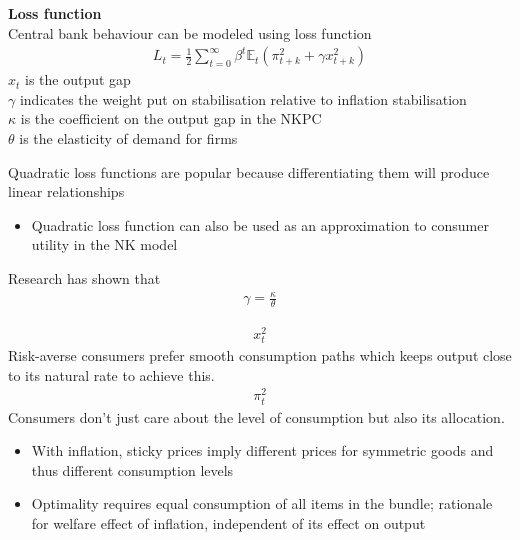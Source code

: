 \documentclass{beamer}
\begin{document}
\begin{frame}
  \textbf{Loss function}\\
   Central bank behaviour can be modeled using loss function   
  \begin{align} 
  L_t = \frac{1}{2}\sum_{t=0}^{\infty}\beta^t\mathbb{E}_t(\pi_{t+k}^2 + \gamma x_{t+k}^2) 
\end{align}
$x_t$ is the output gap\\
$\gamma$ indicates the weight put on stabilisation relative to inflation stabilisation\\
$\kappa$ is the coefficient on the output gap in the NKPC \\
$\theta$ is the elasticity of demand for firms\\
\end{frame}

\begin{frame}
 Quadratic loss functions are popular because differentiating them will produce linear relationships
 \begin{itemize}
   \item Quadratic loss function can also be used as an approximation to consumer utility in the NK model
 \end{itemize}
 Research has shown that 
 \begin{align}
   \gamma=\frac{\kappa}{\theta}   
 \end{align}
\end{frame}

\begin{frame}
  \begin{align}
    x_t^2 
  \end{align}
  Risk-averse consumers prefer smooth consumption paths which keeps output close to its natural rate to achieve this.
  \begin{align}
    \pi_t^2
  \end{align}
  Consumers don't just care about the level of consumption but also its allocation. 
  \begin{itemize}
    \item With inflation, sticky prices imply different prices for symmetric goods and thus different consumption levels
    \item Optimality requires equal consumption of all items in the bundle; rationale for welfare effect of inflation, independent of its effect on output
  \end{itemize}
\end{frame}
\end{document}
